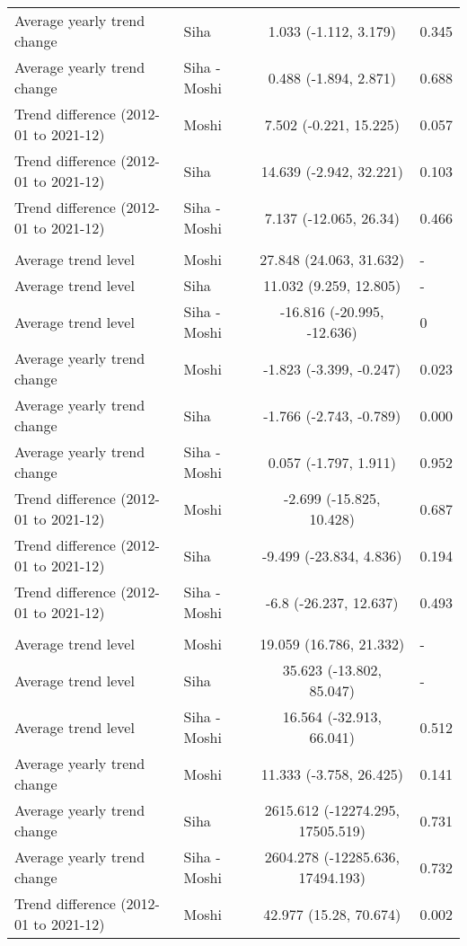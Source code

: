 \begin{longtable}{l|lcl}
Average yearly trend change & Siha & 1.033 (-1.112, 3.179) & 0.345 \\ 
Average yearly trend change & Siha - Moshi & 0.488 (-1.894, 2.871) & 0.688 \\ 
Trend difference (2012-01 to 2021-12) & Moshi & 7.502 (-0.221, 15.225) & 0.057 \\ 
Trend difference (2012-01 to 2021-12) & Siha & 14.639 (-2.942, 32.221) & 0.103 \\ 
Trend difference (2012-01 to 2021-12) & Siha - Moshi & 7.137 (-12.065, 26.34) & 0.466 \\ 
\midrule\addlinespace[2.5pt]
\multicolumn{4}{l}{Tuberculosis} \\ 
\midrule\addlinespace[2.5pt]
Average trend level & Moshi & 27.848 (24.063, 31.632) & - \\ 
Average trend level & Siha & 11.032 (9.259, 12.805) & - \\ 
Average trend level & Siha - Moshi & -16.816 (-20.995, -12.636) & 0 \\ 
Average yearly trend change & Moshi & -1.823 (-3.399, -0.247) & 0.023 \\ 
Average yearly trend change & Siha & -1.766 (-2.743, -0.789) & 0.000 \\ 
Average yearly trend change & Siha - Moshi & 0.057 (-1.797, 1.911) & 0.952 \\ 
Trend difference (2012-01 to 2021-12) & Moshi & -2.699 (-15.825, 10.428) & 0.687 \\ 
Trend difference (2012-01 to 2021-12) & Siha & -9.499 (-23.834, 4.836) & 0.194 \\ 
Trend difference (2012-01 to 2021-12) & Siha - Moshi & -6.8 (-26.237, 12.637) & 0.493 \\ 
\midrule\addlinespace[2.5pt]
\multicolumn{4}{l}{Typhoid} \\ 
\midrule\addlinespace[2.5pt]
Average trend level & Moshi & 19.059 (16.786, 21.332) & - \\ 
Average trend level & Siha & 35.623 (-13.802, 85.047) & - \\ 
Average trend level & Siha - Moshi & 16.564 (-32.913, 66.041) & 0.512 \\ 
Average yearly trend change & Moshi & 11.333 (-3.758, 26.425) & 0.141 \\ 
Average yearly trend change & Siha & 2615.612 (-12274.295, 17505.519) & 0.731 \\ 
Average yearly trend change & Siha - Moshi & 2604.278 (-12285.636, 17494.193) & 0.732 \\ 
Trend difference (2012-01 to 2021-12) & Moshi & 42.977 (15.28, 70.674) & 0.002 \\ 

\end{longtable}
